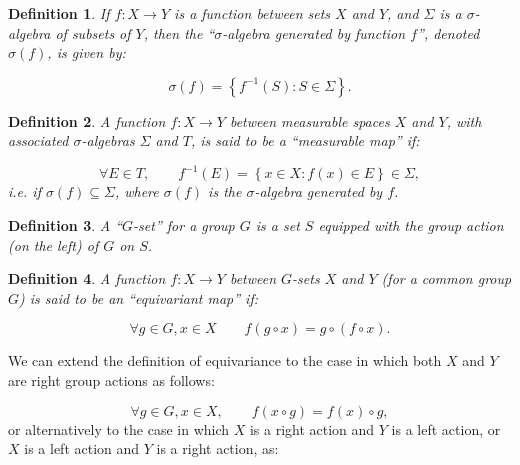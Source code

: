 \documentclass{article}
\newtheorem{definition}{Definition}
\begin{document}
\begin{definition}
If ${f : X \to Y}$ is a function between sets $X$ and $Y$, and ${\Sigma}$ is a ${\sigma}$-algebra of subsets of $Y$, then the ``${\sigma}$-algebra generated by function $f$'', denoted ${\sigma \left( f \right)}$, is given by:

\begin{equation}
\sigma \left( f \right) = \left\lbrace f^{-1} \left( S \right) : S \in \Sigma \right\rbrace.
\end{equation}
\end{definition}

\begin{definition}
A function ${f : X \to Y}$ between measurable spaces $X$ and $Y$, with associated ${\sigma}$-algebras ${\Sigma}$ and $T$, is said to be a ``measurable map'' if:

\begin{equation}
\forall E \in T, \qquad f^{-1} \left( E \right) = \left\lbrace x \in X : f \left( x \right) \in E \right\rbrace \in \Sigma,
\end{equation}
i.e. if ${\sigma \left( f \right) \subseteq \Sigma}$, where ${\sigma \left( f \right)}$ is the ${\sigma}$-algebra generated by $f$.
\end{definition}

\begin{definition}
A ``$G$-set'' for a group $G$\cite{auslander} is a set $S$ equipped with the group action (on the left) of $G$ on $S$.
\end{definition}

\begin{definition}
A function ${f : X \to Y}$ between $G$-sets $X$ and $Y$ (for a common group $G$) is said to be an ``equivariant map'' if:

\begin{equation}
\forall g \in G, x \in X \qquad f \left( g \circ x \right) = g \circ \left( f \circ x \right).
\end{equation}
\end{definition}
We can extend the definition of equivariance to the case in which both $X$ and $Y$ are right group actions as follows:

\begin{equation}
\forall g \in G, x \in X, \qquad f \left( x \circ g \right) = f \left( x \right) \circ g,
\end{equation}
or alternatively to the case in which $X$ is a right action and $Y$ is a left action, or $X$ is a left action and $Y$ is a right action, as:
\end{document}
